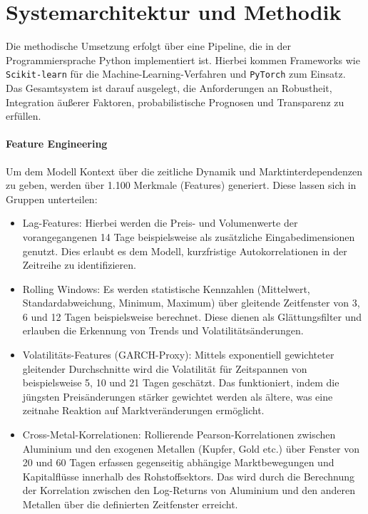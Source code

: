 \section{Systemarchitektur und Methodik}
\label{sec:systemarchitektur_und_methodik}

Die methodische Umsetzung erfolgt über eine Pipeline, die in der Programmiersprache Python implementiert ist. Hierbei kommen Frameworks wie \texttt{Scikit-learn} für die Machine-Learning-Verfahren und \texttt{PyTorch} zum Einsatz. Das Gesamtsystem ist darauf ausgelegt, die Anforderungen an Robustheit, Integration äußerer Faktoren, probabilistische Prognosen und Transparenz zu erfüllen.

\paragraph{Feature Engineering}
Um dem Modell Kontext über die zeitliche Dynamik und Marktinterdependenzen zu geben, werden über 1.100 Merkmale (Features) generiert. Diese lassen sich in Gruppen unterteilen:
\begin{itemize}
    \item Lag-Features: Hierbei werden die Preis- und Volumenwerte der vorangegangenen 14 Tage beispielsweise als zusätzliche Eingabedimensionen genutzt. Dies erlaubt es dem Modell, kurzfristige Autokorrelationen in der Zeitreihe zu identifizieren.
    \item Rolling Windows: Es werden statistische Kennzahlen (Mittelwert, Standardabweichung, Minimum, Maximum) über gleitende Zeitfenster von 3, 6 und 12 Tagen beispielsweise berechnet. Diese dienen als Glättungsfilter und erlauben die Erkennung von Trends und Volatilitätsänderungen.
    \item Volatilitäts-Features (GARCH-Proxy): Mittels exponentiell gewichteter gleitender Durchschnitte wird die Volatilität für Zeitspannen von beispielsweise 5, 10 und 21 Tagen geschätzt. Das funktioniert, indem die jüngsten Preisänderungen stärker gewichtet werden als ältere, was eine zeitnahe Reaktion auf Marktveränderungen ermöglicht.
    \item Cross-Metal-Korrelationen: Rollierende Pearson-Korrelationen zwischen Aluminium und den exogenen Metallen (Kupfer, Gold etc.) über Fenster von 20 und 60 Tagen erfassen gegenseitig abhängige Marktbewegungen und Kapitalflüsse innerhalb des Rohstoffsektors. Das wird durch die Berechnung der Korrelation zwischen den Log-Returns von Aluminium und den anderen Metallen über die definierten Zeitfenster erreicht.
\end{itemize}

